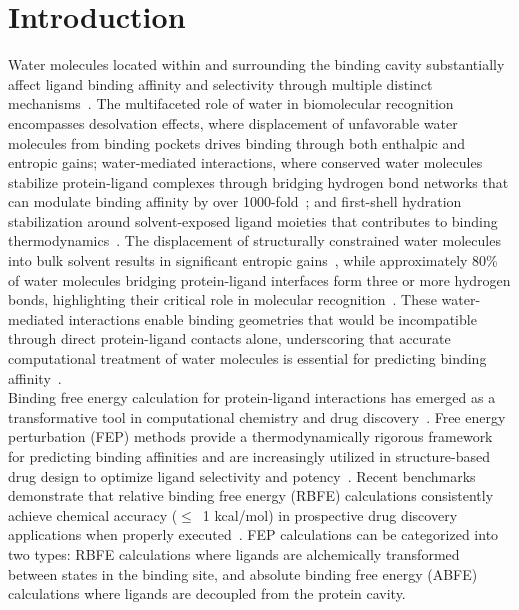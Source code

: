 \documentclass[journal=jacsat,manuscript=article]{achemso}
\begin{document}
\section{Introduction}
Water molecules located within and surrounding the binding cavity substantially affect ligand binding affinity and selectivity through multiple distinct mechanisms~\cite{schiebel2018intriguing}. 
The multifaceted role of water in biomolecular recognition encompasses desolvation effects, where displacement of unfavorable water molecules from binding pockets drives binding through both enthalpic and entropic gains; 
water-mediated interactions, where conserved water molecules stabilize protein-ligand complexes through bridging hydrogen bond networks that can modulate binding affinity by over 1000-fold~\cite{darby2019water}; 
and first-shell hydration stabilization around solvent-exposed ligand moieties that contributes to binding thermodynamics~\cite{mahmoud2020elucidating, wang2011ligand}. 
The displacement of structurally constrained water molecules into bulk solvent results in significant entropic gains~\cite{cui2018role, portman2014enthalpy}, 
while approximately 80\% of water molecules bridging protein-ligand interfaces form three or more hydrogen bonds, 
highlighting their critical role in molecular recognition~\cite{poornima1995hydration}. 
These water-mediated interactions enable binding geometries that would be incompatible through direct protein-ligand contacts alone, 
underscoring that accurate computational treatment of water molecules is essential for predicting binding affinity~\cite{baron2010water,zsido2021role, maurer2019water}. \\
\newline
Binding free energy calculation for protein-ligand interactions has emerged as a transformative tool in computational chemistry and drug discovery~\cite{jiang2010free, wang2019protein, Qian2024}. 
Free energy perturbation (FEP) methods provide a thermodynamically rigorous framework for predicting binding affinities and are increasingly utilized in structure-based drug design to optimize ligand selectivity and potency~\cite{venkatesh2026evaluating, wang2019protein}. 
Recent benchmarks demonstrate that relative binding free energy (RBFE) calculations consistently achieve chemical accuracy ($\leq$~1 kcal/mol) in prospective drug discovery applications when properly executed~\cite{ross2023maximal}. 
FEP calculations can be categorized into two types: RBFE calculations where ligands are alchemically transformed between states in the binding site, 
and absolute binding free energy (ABFE) calculations where ligands are decoupled from the protein cavity. 
\end{document}
